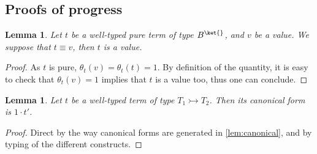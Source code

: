 \documentclass[10pt,a4paper]{article}
\newcommand{\bvar}{B}
\newcommand\bkvar{\bvar^{\ket{}}}
\newcommand{\anyfunc}{\rightarrowtail}
\newcommand{\qt}[2]{\theta_{#1}(#2)}
\newtheorem{lemma}[theorem]{Lemma}
\begin{document}
\subsection{Proofs of progress}

\begin{lemma}\label{lem:equiv-pure}
  Let $t$ be a well-typed pure term of type $\bkvar$, and $v$ be a value.
  We suppose that $t \equiv v$, then $t$ is a value.
\end{lemma}

\begin{proof}
  As $t$ is pure, $ \qt t v = \qt t t = 1$.
  By definition of the quantity, it is easy to check
  that $\qt t v = 1$ implies that $t$ is a value too,
  thus one can conclude. \qedhere
\end{proof}

\begin{lemma}\label{lem:canonical-higher}
  Let $t$ be a well-typed term of type $T_1 \anyfunc T_2$.
  Then its canonical form is $1 \cdot t'$.
\end{lemma}

\begin{proof}
  Direct by the way canonical forms are generated in \autoref{lem:canonical},
  and by typing of the different constructs. \qedhere
\end{proof}

\progress*
\end{document}
